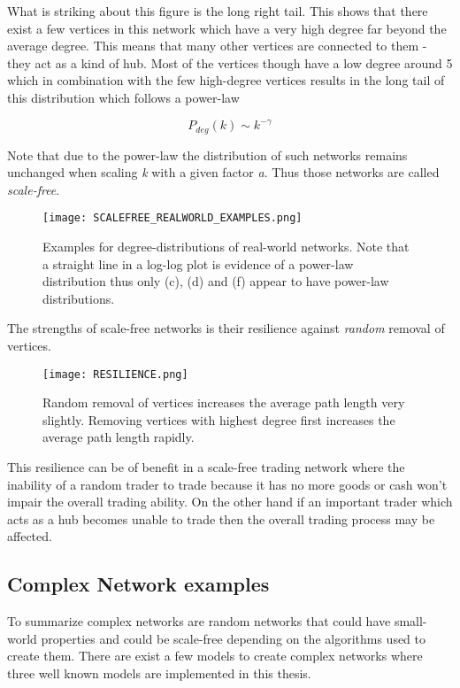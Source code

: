 \documentclass[../Bachelorarbeit.tex]{subfiles}
\begin{document}
What is striking about this figure is the long right tail. This shows that there exist a few vertices in this network which have a very high degree far beyond the average degree. This means that many other vertices are connected to them - they act as a kind of hub. Most of the vertices though have a low degree around 5 which in combination with the few high-degree vertices results in the long tail of this distribution which follows a power-law

\begin{equation}
P_{deg}(k) \sim k^{-\gamma}
\end{equation}

Note that due to the power-law the distribution of such networks remains unchanged when scaling \textit{k} with a given factor \textit{a}. Thus those networks are called \textit{scale-free}.

\begin{figure}[H]
	\centering
  \texttt{[image: SCALEFREE\_REALWORLD\_EXAMPLES.png]}
  	\caption{Examples for degree-distributions of real-world networks. Note that a straight line in a log-log plot is evidence of a power-law distribution thus only (c), (d) and (f) appear to have power-law distributions. \cite{Newman_ComplexNetworks} }
	\label{fig:SCALEFREE_REALWORLD_EXAMPLES}
\end{figure}

\medskip

The strengths of scale-free networks is their resilience against \textit{random} removal of vertices.

\begin{figure}[H]
	\centering
  \texttt{[image: RESILIENCE.png]}
  	\caption{Random removal of vertices increases the average path length very slightly. Removing vertices with highest degree first increases the average path length rapidly. \cite{Newman_ComplexNetworks} }
	\label{fig:RESILIENCE}
\end{figure}

This resilience can be of benefit in a scale-free trading network where the inability of a random trader to trade because it has no more goods or cash won't impair the overall trading ability. On the other hand if an important trader which acts as a hub becomes unable to trade then the overall trading process may be affected.

\subsection{Complex Network examples}
To summarize complex networks are random networks that could have small-world properties and could be scale-free depending on the algorithms used to create them. There are exist a few models to create complex networks where three well known models are implemented in this thesis.
\end{document}
